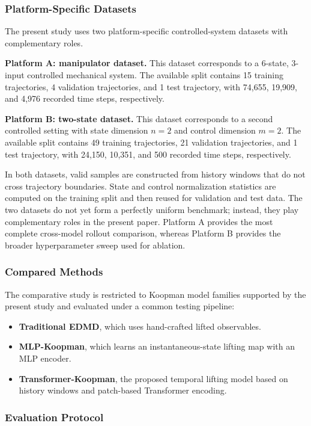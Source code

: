 \documentclass[journal]{IEEEtran}
\begin{document}
\subsubsection{Platform-Specific Datasets}

The present study uses two platform-specific controlled-system datasets with complementary roles.

\textbf{Platform A: manipulator dataset.} This dataset corresponds to a 6-state, 3-input controlled mechanical system. The available split contains 15 training trajectories, 4 validation trajectories, and 1 test trajectory, with 74,655, 19,909, and 4,976 recorded time steps, respectively.

\textbf{Platform B: two-state dataset.} This dataset corresponds to a second controlled setting with state dimension $n=2$ and control dimension $m=2$. The available split contains 49 training trajectories, 21 validation trajectories, and 1 test trajectory, with 24,150, 10,351, and 500 recorded time steps, respectively.

In both datasets, valid samples are constructed from history windows that do not cross trajectory boundaries. State and control normalization statistics are computed on the training split and then reused for validation and test data. The two datasets do not yet form a perfectly uniform benchmark; instead, they play complementary roles in the present paper. Platform A provides the most complete cross-model rollout comparison, whereas Platform B provides the broader hyperparameter sweep used for ablation.

\subsubsection{Compared Methods}

The comparative study is restricted to Koopman model families supported by the present study and evaluated under a common testing pipeline:
\begin{itemize}
    \item \textbf{Traditional EDMD}, which uses hand-crafted lifted observables.
    \item \textbf{MLP-Koopman}, which learns an instantaneous-state lifting map with an MLP encoder.
    \item \textbf{Transformer-Koopman}, the proposed temporal lifting model based on history windows and patch-based Transformer encoding.
\end{itemize}

\subsubsection{Evaluation Protocol}
\end{document}
